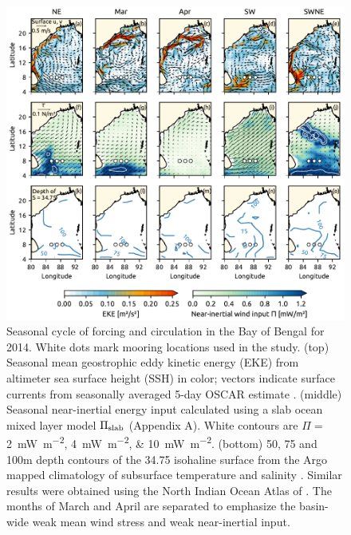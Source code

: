 \documentclass[onecol]{ametsoc}
\begin{document}
\begin{figure}
\centering
\includegraphics[width=\textwidth]{figure2-spatial-maps.pdf}
\caption{\label{fig:spatial}
Seasonal cycle of forcing and circulation in the Bay of Bengal for 2014. White dots mark mooring locations used in the study. (top) Seasonal mean geostrophic eddy kinetic energy (EKE) from altimeter sea surface height (SSH) in color; vectors indicate surface currents from seasonally averaged 5-day OSCAR estimate \citep{oscar,Bonjean2002}. (middle) Seasonal near-inertial energy input calculated using a slab ocean mixed layer model \(\Pi_\text{slab}\) (Appendix A). White contours are \(\Pi=\) \SIlist{2; 4; 10}{\milli\W\per\square\metre}. (bottom) 50, 75 and 100m depth contours of the 34.75 isohaline surface from the Argo mapped climatology of subsurface temperature and salinity \citep{Roemmich2009}. Similar results were obtained using the North Indian Ocean Atlas of \cite{Chatterjee2012}. The months of March and April are separated to emphasize the basin-wide weak mean wind stress and weak near-inertial input.}
\end{figure}
\end{document}

